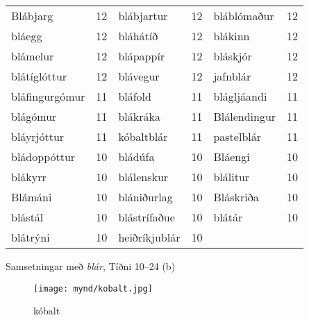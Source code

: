 \documentclass[../samsetningasafn.tex]{subfiles}
\begin{document}
\begin{wordlist}[H]
\begin{tcolorbox}

	\setlength{\extrarowheight}{3pt}
	\begin{tabular}{BlBlBl}		
		Blábjarg		& 12		& 	
		blábjartur	& 12		& 	
		bláblómaður	& 12		\\ 	
		bláegg		& 12		& 	
		bláhátíð		& 12		& 	
		blákinn		& 12		\\ 	
		blámelur	& 12		& 	
		blápappír	& 12		& 	
		bláskjór		& 12		\\ 	
		blátíglóttur	& 12		& 	
		blávegur		& 12		& 	
		jafnblár		& 12		\\ 	
		bláfingurgómur & 11		& 	
		bláfold		& 11		& 	
		blágljáandi	& 11		\\ 	
		blágómur	& 11		& 
		blákráka		& 11		& 	
		Blálendingur	& 11		\\ 	
		bláyrjóttur	& 11		& 	
		kóbaltblár	& 11		& 
		pastelblár	& 11		\\ 	
		bládoppóttur	& 10		& 
		bládúfa		& 10		& 	
		Bláengi		& 10		\\ 
		blákyrr		& 10		& 
		blálenskur	& 10		& 	
		blálitur		& 10		\\ 	
		Blámáni		& 10		& 
		blániðurlag	& 10		& 
		Bláskriða	& 10		\\ 	
		blástál		& 10		& 
		blástrífaðue	& 10		& 
		blátár		& 10		\\ 
		blátrýni		& 10		& 
		heiðríkjublár	& 10		& 
					&
	\end{tabular}

\end{tcolorbox}
	\caption{Samsetningar með \textit{blár}, Tíðni 10--24 (b)}
	\label{listi:blatt.10b}
\end{wordlist}

\begin{figure}[H]
\begin{tcolorbox}
\centering
	\texttt{[image: mynd/kobalt.jpg]}
\end{tcolorbox}
	\caption{kóbalt}
	\label{mynd:kobalt}
\end{figure}
\end{document}

